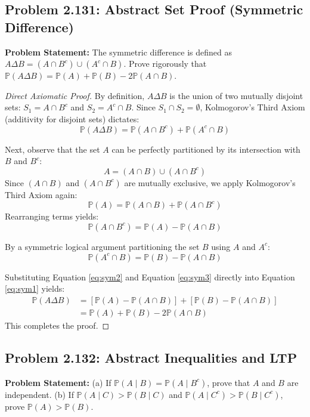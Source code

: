 \documentclass[12pt]{article}
\begin{document}
\subsection{Problem 2.131: Abstract Set Proof (Symmetric Difference)}
\textbf{Problem Statement:} The symmetric difference is defined as $A \Delta B = (A \cap B^c) \cup (A^c \cap B)$. Prove rigorously that $\mathbb{P}(A \Delta B) = \mathbb{P}(A) + \mathbb{P}(B) - 2\mathbb{P}(A \cap B)$.

\begin{proof}[Direct Axiomatic Proof]
By definition, $A \Delta B$ is the union of two mutually disjoint sets: $S_1 = A \cap B^c$ and $S_2 = A^c \cap B$. Since $S_1 \cap S_2 = \emptyset$, Kolmogorov's Third Axiom (additivity for disjoint sets) dictates:
\begin{equation} \label{eq:sym1}
    \mathbb{P}(A \Delta B) = \mathbb{P}(A \cap B^c) + \mathbb{P}(A^c \cap B)
\end{equation}

Next, observe that the set $A$ can be perfectly partitioned by its intersection with $B$ and $B^c$:
\[ A = (A \cap B) \cup (A \cap B^c) \]
Since $(A \cap B)$ and $(A \cap B^c)$ are mutually exclusive, we apply Kolmogorov's Third Axiom again:
\[ \mathbb{P}(A) = \mathbb{P}(A \cap B) + \mathbb{P}(A \cap B^c) \]
Rearranging terms yields:
\begin{equation} \label{eq:sym2}
    \mathbb{P}(A \cap B^c) = \mathbb{P}(A) - \mathbb{P}(A \cap B)
\end{equation}

By a symmetric logical argument partitioning the set $B$ using $A$ and $A^c$:
\begin{equation} \label{eq:sym3}
    \mathbb{P}(A^c \cap B) = \mathbb{P}(B) - \mathbb{P}(A \cap B)
\end{equation}

Substituting Equation \ref{eq:sym2} and Equation \ref{eq:sym3} directly into Equation \ref{eq:sym1} yields:
\begin{align*}
    \mathbb{P}(A \Delta B) &= \left[ \mathbb{P}(A) - \mathbb{P}(A \cap B) \right] + \left[ \mathbb{P}(B) - \mathbb{P}(A \cap B) \right] \\
    &= \mathbb{P}(A) + \mathbb{P}(B) - 2\mathbb{P}(A \cap B)
\end{align*}
This completes the proof.
\end{proof}

\subsection{Problem 2.132: Abstract Inequalities and LTP}
\textbf{Problem Statement:} 
(a) If $\mathbb{P}(A \mid B) = \mathbb{P}(A \mid B^c)$, prove that $A$ and $B$ are independent.
(b) If $\mathbb{P}(A \mid C) > \mathbb{P}(B \mid C)$ and $\mathbb{P}(A \mid C^c) > \mathbb{P}(B \mid C^c)$, prove $\mathbb{P}(A) > \mathbb{P}(B)$.
\end{document}
